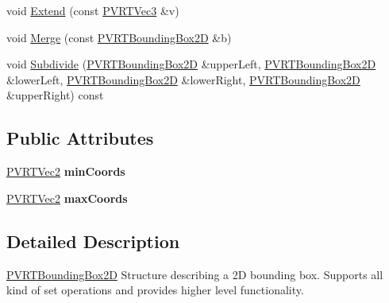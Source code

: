 \begin{DoxyCompactItemize}
\item 
void \hyperlink{structpvrnavigation_1_1_p_v_r_t_bounding_box2_d_a8b5a6a09cbbde92c96fad7d990d9328f}{Extend} (const \hyperlink{struct_p_v_r_t_vec3}{P\+V\+R\+T\+Vec3} \&v)
\item 
void \hyperlink{structpvrnavigation_1_1_p_v_r_t_bounding_box2_d_a5b0b1ccc29bb3a459b7e7c9e249f6490}{Merge} (const \hyperlink{structpvrnavigation_1_1_p_v_r_t_bounding_box2_d}{P\+V\+R\+T\+Bounding\+Box2\+D} \&b)
\item 
void \hyperlink{structpvrnavigation_1_1_p_v_r_t_bounding_box2_d_a2b8d80d993b48263951192f8ce6f008f}{Subdivide} (\hyperlink{structpvrnavigation_1_1_p_v_r_t_bounding_box2_d}{P\+V\+R\+T\+Bounding\+Box2\+D} \&upper\+Left, \hyperlink{structpvrnavigation_1_1_p_v_r_t_bounding_box2_d}{P\+V\+R\+T\+Bounding\+Box2\+D} \&lower\+Left, \hyperlink{structpvrnavigation_1_1_p_v_r_t_bounding_box2_d}{P\+V\+R\+T\+Bounding\+Box2\+D} \&lower\+Right, \hyperlink{structpvrnavigation_1_1_p_v_r_t_bounding_box2_d}{P\+V\+R\+T\+Bounding\+Box2\+D} \&upper\+Right) const 
\end{DoxyCompactItemize}
\subsection*{Public Attributes}
\begin{DoxyCompactItemize}
\item 
\hypertarget{structpvrnavigation_1_1_p_v_r_t_bounding_box2_d_a0940e0e2daad2c30e361aa9f12bcdfa0}{\hyperlink{struct_p_v_r_t_vec2}{P\+V\+R\+T\+Vec2} {\bfseries min\+Coords}}\label{structpvrnavigation_1_1_p_v_r_t_bounding_box2_d_a0940e0e2daad2c30e361aa9f12bcdfa0}

\item 
\hypertarget{structpvrnavigation_1_1_p_v_r_t_bounding_box2_d_af77bece3cf071d0647013aa3c1e4e869}{\hyperlink{struct_p_v_r_t_vec2}{P\+V\+R\+T\+Vec2} {\bfseries max\+Coords}}\label{structpvrnavigation_1_1_p_v_r_t_bounding_box2_d_af77bece3cf071d0647013aa3c1e4e869}

\end{DoxyCompactItemize}


\subsection{Detailed Description}


  \hyperlink{structpvrnavigation_1_1_p_v_r_t_bounding_box2_d}{P\+V\+R\+T\+Bounding\+Box2\+D}  Structure describing a 2\+D bounding box. Supports all kind of set operations and provides higher level functionality. 

